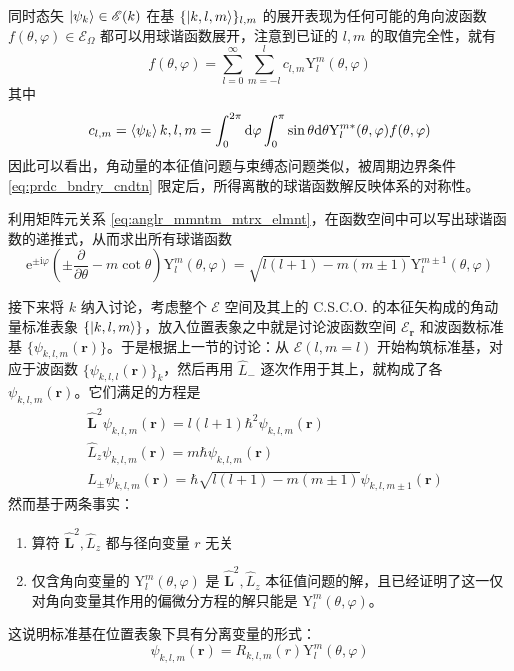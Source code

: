 \documentclass[cn,10pt,math=newtx,citestyle=gb7714-2015,bibstyle=gb7714-2015]{elegantbook}
\def\bm{\boldsymbol}
\def\ms{\mathscr}
\def\mr{\mathrm}
\def\d{\mathrm d}
\def\e{\mathrm e}
\def\i{\mathrm i}
\def\vphi{\varphi}
\begin{document}
同时态矢 $\ket{\psi_k}\in\ms E(k)$ 在基 $\{\ket{k,l,m}\}_{l,m}$ 的展开表现为任何可能的角向波函数 $f(\theta,\vphi)\in\ms E_\Omega$ 都可以用球谐函数展开，注意到已证的 $l,m$ 的取值完全性，就有
\begin{equation}
    f(\theta,\vphi)=\sum_{l=0}^\infty\sum_{m=-l}^l c_{l,m}\mr Y_l^m(\theta,\vphi)
\end{equation}
其中
\begin{equation}
    c_{l,m} = \braket{\psi_k}{k,l,m} = \int_0^{2\pi}\d\vphi\int_0^\pi\sin\theta\d\theta\mr Y_l^{m*}(\theta,\vphi)f(\theta,\vphi)
\end{equation}
因此可以看出，角动量的本征值问题与束缚态问题类似，被周期边界条件 \ref{eq:prdc_bndry_cndtn} 限定后，所得离散的球谐函数解反映体系的对称性。

利用矩阵元关系 \ref{eq:anglr_mmntm_mtrx_elmnt}，在函数空间中可以写出球谐函数的递推式，从而求出所有球谐函数
\begin{equation}\label{eq:sphrcl_hrmnc_rcrsn_frml}
    \e^{\pm\i\vphi}\left(\pm\frac{\partial}{\partial\theta}-m\cot\theta\right)\mr Y_l^m(\theta,\vphi)=\sqrt{l(l+1)-m(m\pm 1)}\mr Y_l^{m\pm1}(\theta,\vphi)
\end{equation}

接下来将 $k$ 纳入讨论，考虑整个 $\ms E$ 空间及其上的 C.S.C.O. 的本征矢构成的角动量标准表象 $\{\ket{k,l,m}\}$，放入位置表象之中就是讨论波函数空间 $\ms E_{\bm r}$ 和波函数标准基 $\{\psi_{k,l,m}(\bm r)\}$。于是根据上一节的讨论：从 $\ms E(l,m=l)$ 开始构筑标准基，对应于波函数 $\{\psi_{k,l,l}(\bm r)\}_k$，然后再用 $\hat L_-$ 逐次作用于其上，就构成了各 $\psi_{k,l,m}(\bm r)$。它们满足的方程是
\begin{align}
    &\hat{\bm L}^2\psi_{k,l,m}(\bm r) = l(l+1)\hbar^2\psi_{k,l,m}(\bm r)\\
    &\hat L_z\psi_{k,l,m}(\bm r) = m\hbar \psi_{k,l,m}(\bm r)\\
    &L_\pm \psi_{k,l,m}(\bm r) = \hbar\sqrt{l(l+1)-m(m\pm 1)}\psi_{k,l,m\pm 1}(\bm r)\label{eq:orbtl_anglr_mmntm_egnfnctn_3}
\end{align}
然而基于两条事实：
\begin{enumerate}
    \item 算符 $\hat{\bm L}^2,\hat L_z$ 都与径向变量 $r$ 无关
    \item 仅含角向变量的 $\mr Y_l^m(\theta,\vphi)$ 是 $\hat{\bm L}^2, \hat L_z$ 本征值问题的解，且已经证明了这一仅对角向变量其作用的偏微分方程的解只能是 $\mr Y_l^m(\theta,\vphi)$。
\end{enumerate}
这说明标准基在位置表象下具有分离变量的形式：
\begin{equation}
    \psi_{k,l,m}(\bm r)=R_{k,l,m}(r)\mr Y_l^m(\theta,\vphi)
\end{equation}
\end{document}

